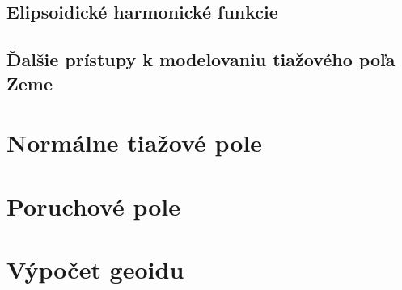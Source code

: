 \documentclass[a4paper, 12pt]{book}
\begin{document}

\section{Elipsoidické harmonické funkcie}







\section{Ďalšie prístupy k modelovaniu tiažového poľa Zeme}

\chapter{Normálne tiažové pole}
\label{sec:normal_gravity_field}








\chapter{Poruchové pole}
\label{sec:disturbing_field}








\chapter{Výpočet geoidu}
\label{sec:geoid_determination}
\end{document}
